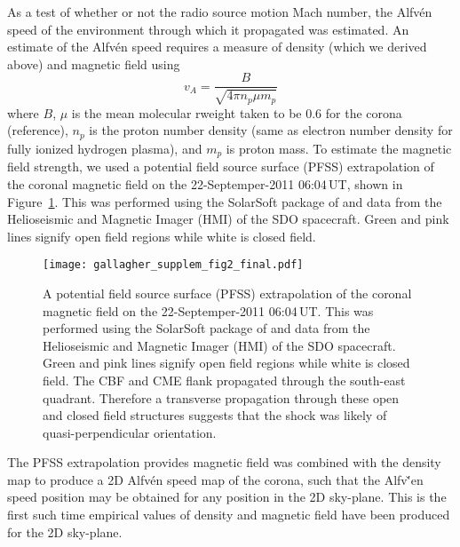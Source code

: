 As a test of whether or not the radio source motion Mach number, the Alfv\'{e}n speed of the environment through which it propagated was estimated. An estimate of the Alfv\'{e}n speed requires a measure of density (which we derived above) and magnetic field using 
\begin{equation}
v_A = \frac{B}{\sqrt{4\pi n_p \mu m_p}}
\end{equation}
where $B$, $\mu$ is the mean molecular rweight taken to be 0.6 for the corona (reference), $n_p$ is the proton number density (same as electron number density for fully ionized hydrogen plasma), and $m_p$ is proton mass. To estimate the magnetic field strength, we used a potential field source surface (PFSS) extrapolation of the coronal magnetic field on the 22-Septemper-2011 06:04\,UT, shown in Figure~\ref{fig:pfss}. 
This was performed using the SolarSoft package of \citet{schrijver2003} and data from the Helioseismic and Magnetic Imager (HMI)\citep{scherrer2012} of the SDO spacecraft. Green and pink lines signify open field regions while white is closed field.
\begin{figure}[t!]
\begin{center}
\texttt{[image: gallagher\_supplem\_fig2\_final.pdf]}
\caption[A potential field source surface extrapolation of the corona magnetic field]{A potential field source surface (PFSS) extrapolation of the coronal magnetic field on the 22-Septemper-2011 06:04\,UT. This was performed using the SolarSoft package of \citet{schrijver2003} and data from the Helioseismic and Magnetic Imager (HMI)\citep{scherrer2012} of the SDO spacecraft. Green and pink lines signify open field regions while white is closed field. The CBF and CME flank propagated through the south-east quadrant. Therefore a transverse propagation through these open and closed field structures suggests that the shock was likely of quasi-perpendicular orientation.}%
\label{fig:pfss}
\end{center}
\end{figure}
The PFSS extrapolation provides magnetic field was combined with the density map to produce a 2D Alfv\'{e}n speed map of the corona, such that the Alfv\v'{e}n speed position may be obtained for any position in the 2D sky-plane. This is the first such time empirical values of density and magnetic field have been produced for the 2D sky-plane. 

